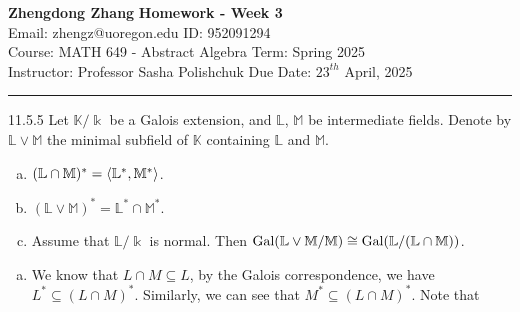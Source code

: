 \documentclass[a4paper, 12pt]{article}
\begin{document}
\noindent
\large\textbf{Zhengdong Zhang} \hfill \textbf{Homework - Week 3}   \\
Email: zhengz@uoregon.edu \hfill ID: 952091294 \\
\normalsize Course: MATH 649 - Abstract Algebra  \hfill Term: Spring 2025\\
Instructor: Professor Sasha Polishchuk \hfill Due Date: $23^{th}$ April, 2025 \\
\noindent\rule{7in}{2.8pt}



\begin{problem}{11.5.5}
Let \(\mathbb{K}/\Bbbk\) be a Galois extension, and \(\mathbb{L}\), \(\mathbb{M}\) be intermediate fields. Denote by \(\mathbb{L}\vee \mathbb{M}\) the minimal subfield of \(\mathbb{K}\) containing 
\(\mathbb{L}\) and \(\mathbb{M}\). 
\begin{enumerate}[(a)]
\item \((\mathbb{L}\cap \mathbb{M})^*=\langle \mathbb{L}^*,\mathbb{M}^*\rangle\).
\item \((\mathbb{L}\vee \mathbb{M})^*=\mathbb{L}^*\cap \mathbb{M}^*\).
\item Assume that \(\mathbb{L}/\Bbbk\) is normal. Then \(\text{Gal}(\mathbb{L}\vee \mathbb{M}/\mathbb{M})\cong \text{Gal}(\mathbb{L}/(\mathbb{L}\cap \mathbb{M}))\).
\end{enumerate}
\end{problem}
\begin{solution}
\begin{enumerate}[(a)]
\item We know that \(L\cap M\subseteq L\), by the Galois correspondence, we have \(L^*\subseteq (L\cap M)^*\). Similarly, we can see that \(M^*\subseteq (L\cap M)^*\). Note that \(\)
\end{enumerate}
\end{solution}
\end{document}
